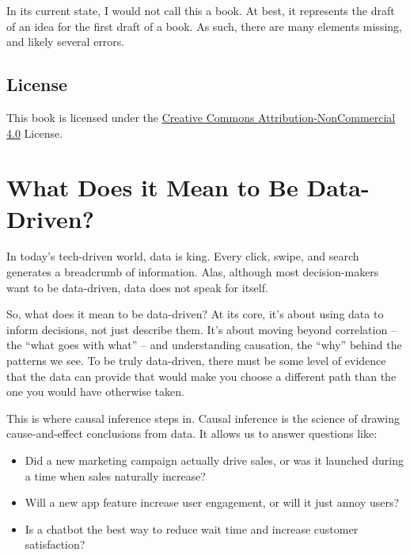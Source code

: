 \documentclass[
  letterpaper,
  DIV=11,
  numbers=noendperiod]{scrreprt}
\providecommand{\tightlist}{%
  \setlength{\itemsep}{0pt}\setlength{\parskip}{0pt}}\usepackage{longtable,booktabs,array}
\begin{document}

In its current state, I would not call this a book. At best, it
represents the draft of an idea for the first draft of a book. As such,
there are many elements missing, and likely several errors.

\section*{License}\label{license}


This book is licensed under the
\href{https://creativecommons.org/licenses/by-nc/4.0/}{Creative Commons
Attribution-NonCommercial 4.0} License.

\chapter{What Does it Mean to Be
Data-Driven?}\label{what-does-it-mean-to-be-data-driven}

In today's tech-driven world, data is king. Every click, swipe, and
search generates a breadcrumb of information. Alas, although most
decision-makers want to be data-driven, data does not speak for itself.

So, what does it mean to be data-driven? At its core, it's about using
data to inform decisions, not just describe them. It's about moving
beyond correlation -- the ``what goes with what'' -- and understanding
causation, the ``why'' behind the patterns we see. To be truly
data-driven, there must be some level of evidence that the data can
provide that would make you choose a different path than the one you
would have otherwise taken.

This is where causal inference steps in. Causal inference is the science
of drawing cause-and-effect conclusions from data. It allows us to
answer questions like:

\begin{itemize}
\tightlist
\item
  Did a new marketing campaign actually drive sales, or was it launched
  during a time when sales naturally increase?
\item
  Will a new app feature increase user engagement, or will it just annoy
  users?
\item
  Is a chatbot the best way to reduce wait time and increase customer
  satisfaction?
\end{itemize}
\end{document}

